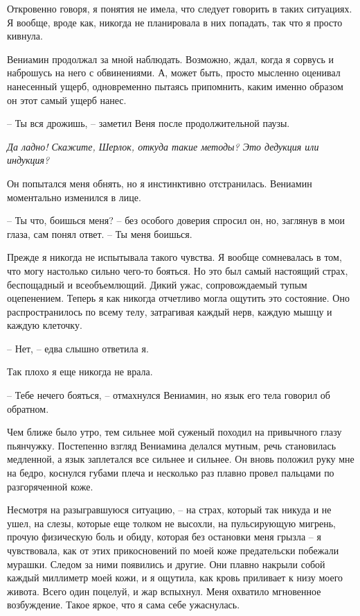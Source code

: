\documentclass[
]{book}
\begin{document}
Откровенно говоря, я понятия не имела, что следует говорить в таких ситуациях. Я вообще, вроде как, никогда не планировала в них попадать, так что я просто кивнула.

Вениамин продолжал за мной наблюдать. Возможно, ждал, когда я сорвусь и наброшусь на него с обвинениями. А, может быть, просто мысленно оценивал нанесенный ущерб, одновременно пытаясь припомнить, каким именно образом он этот самый ущерб нанес.

-- Ты вся дрожишь, -- заметил Веня после продолжительной паузы.

\emph{Да ладно! Скажите, Шерлок, откуда такие методы? Это дедукция или индукция?}

Он попытался меня обнять, но я инстинктивно отстранилась. Вениамин моментально изменился в лице.

-- Ты что, боишься меня? -- без особого доверия спросил он, но, заглянув в мои глаза, сам понял ответ. -- Ты меня боишься.

Прежде я никогда не испытывала такого чувства. Я вообще сомневалась в том, что могу настолько сильно чего-то бояться. Но это был самый настоящий страх, беспощадный и всеобъемлющий. Дикий ужас, сопровождаемый тупым оцепенением. Теперь я как никогда отчетливо могла ощутить это состояние. Оно распространилось по всему телу, затрагивая каждый нерв, каждую мышцу и каждую клеточку.

-- Нет, -- едва слышно ответила я.

Так плохо я еще никогда не врала.

-- Тебе нечего бояться, -- отмахнулся Вениамин, но язык его тела говорил об обратном.

Чем ближе было утро, тем сильнее мой суженый походил на привычного глазу пьянчужку. Постепенно взгляд Вениамина делался мутным, речь становилась медленной, а язык заплетался все сильнее и сильнее. Он вновь положил руку мне на бедро, коснулся губами плеча и несколько раз плавно провел пальцами по разгоряченной коже.

Несмотря на разыгравшуюся ситуацию, -- на страх, который так никуда и не ушел, на слезы, которые еще толком не высохли, на пульсирующую мигрень, прочую физическую боль и обиду, которая без остановки меня грызла -- я чувствовала, как от этих прикосновений по моей коже предательски побежали мурашки. Следом за ними появились и другие. Они плавно накрыли собой каждый миллиметр моей кожи, и я ощутила, как кровь приливает к низу моего живота. Всего один поцелуй, и жар вспыхнул. Меня охватило мгновенное возбуждение. Такое яркое, что я сама себе ужаснулась.
\end{document}
